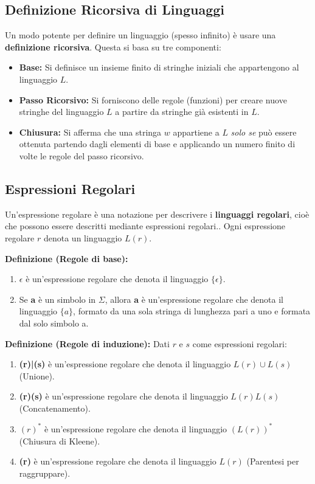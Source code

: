 \documentclass[a4paper, 11pt]{article}
\begin{document}
\subsection{Definizione Ricorsiva di Linguaggi}
Un modo potente per definire un linguaggio (spesso infinito) è usare una \textbf{definizione ricorsiva}. Questa si basa su tre componenti:
\begin{itemize}
    \item \textbf{Base:} Si definisce un insieme finito di stringhe iniziali che appartengono al linguaggio $L$.
    \item \textbf{Passo Ricorsivo:} Si forniscono delle regole (funzioni) per creare nuove stringhe del linguaggio $L$ a partire da stringhe già esistenti in $L$.
    \item \textbf{Chiusura:} Si afferma che una stringa $w$ appartiene a $L$ \textit{solo se} può essere ottenuta partendo dagli elementi di base e applicando un numero finito di volte le regole del passo ricorsivo.
\end{itemize}


\subsection{Espressioni Regolari}
Un'espressione regolare è una notazione per descrivere i \textbf{linguaggi regolari}, cioè che possono essere descritti mediante espressioni regolari.. Ogni espressione regolare $r$ denota un linguaggio $L(r)$.

\vspace{0.2 cm}

\textbf{Definizione (Regole di base):}
\begin{enumerate}
    \item \textbf{$\epsilon$} è un'espressione regolare che denota il linguaggio $\{\epsilon\}$.
    \item Se \textbf{a} è un simbolo in $\Sigma$, allora \textbf{a} è un'espressione regolare che denota il linguaggio $\{a\}$, formato da una sola stringa di lunghezza pari a uno e formata dal solo simbolo a.
\end{enumerate}

\textbf{Definizione (Regole di induzione):} Dati $r$ e $s$ come espressioni regolari:
\begin{enumerate}
    \item \textbf{(r)|(s)} è un'espressione regolare che denota il linguaggio $L(r) \cup L(s)$ (Unione).
    \item \textbf{(r)(s)} è un'espressione regolare che denota il linguaggio $L(r)L(s)$ (Concatenamento).
    \item \textbf{$(r)^*$} è un'espressione regolare che denota il linguaggio $(L(r))^*$ (Chiusura di Kleene).
    \item \textbf{(r)} è un'espressione regolare che denota il linguaggio $L(r)$ (Parentesi per raggruppare).
\end{enumerate}
\end{document}
